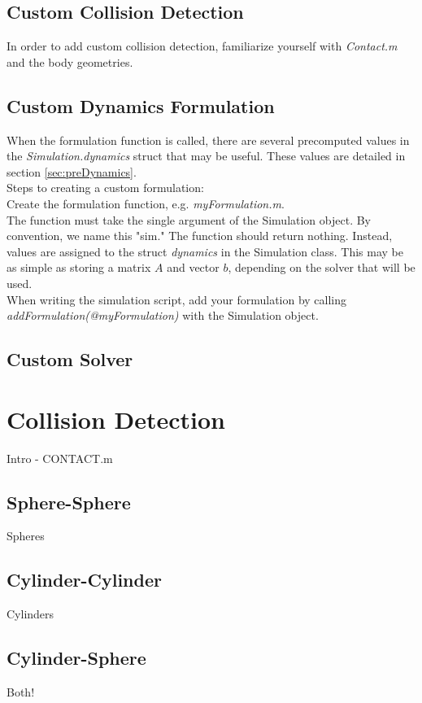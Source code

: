 \documentclass{article}
\newcommand{\tab}{\hspace*{2em}}
\begin{document}
\subsection{Custom Collision Detection}
In order to add custom collision detection, familiarize yourself with \emph{Contact.m} and the body geometries.  

\subsection{Custom Dynamics Formulation}
When the formulation function is called, there are several precomputed values in the \emph{Simulation.dynamics} struct that may be useful.  These values are detailed in section \ref{sec:preDynamics}.   \\
Steps to creating a custom formulation: \\
Create the formulation function, e.g. \emph{myFormulation.m}. \\
\tab The function must take the single argument of the Simulation object.  By convention, we name this "sim."  The function should return nothing.  Instead, values are assigned to the struct \emph{dynamics} in the Simulation class.  This may be as simple as storing a matrix $A$ and vector $b$, depending on the solver that will be used.   \\
When writing the simulation script, add your formulation by calling \emph{addFormulation(@myFormulation)} with the Simulation object.    

\subsection{Custom Solver}

\section{Collision Detection}
\label{sec:collisionDetection}
Intro - CONTACT.m

\subsection{Sphere-Sphere}
Spheres
\subsection{Cylinder-Cylinder}
Cylinders
\subsection{Cylinder-Sphere}
Both!
\end{document}
